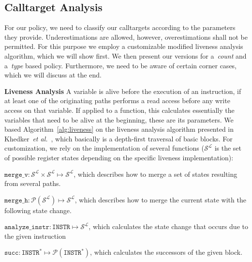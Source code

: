     
\subsection{Calltarget Analysis}
\label{section:calltargetanalysis}
For our policy, we need to classify our calltargets according to the parameters they provide. Underestimations are allowed, however, overestimations shall not be permitted. 
For this purpose we employ a customizable modified liveness analysis algorithm, which we will show first. We then present our versions for a~\emph{count} and a~\emph{type} 
based policy. Furthermore, we need to be aware of certain corner cases, which we will discuss at the end.

\textbf{Liveness Analysis}
A variable is alive before the execution of an instruction, if at least one of the originating paths performs a read access before any write access  on that variable. 
If applied to a function, this calculates essentially the variables that need to be alive at the beginning, these are its parameters.
We based Algorithm~\ref{alg:liveness} on the liveness analysis algorithm presented in Khedker~\textit{et al.}~\cite{khedker2009data}, which basically
is a depth-first traversal of basic blocks. For customization, we rely on the implementation of several functions ($\mathcal{S}^\mathcal{L}$ is the
set of possible register states depending on the specific liveness implementation):

$\texttt{merge\_v} : \mathcal{S}^\mathcal{L} \times \mathcal{S}^\mathcal{L} \mapsto \mathcal{S}^\mathcal{L}$, which describes how to merge a set of states resulting from several paths.

$\texttt{merge\_h} : \mathcal{P}(\mathcal{S}^\mathcal{L}) \mapsto \mathcal{S}^\mathcal{L}$, which describes how to merge the current state with the following state change.

$\texttt{analyze\_instr} : \texttt{INSTR} \mapsto \mathcal{S}^\mathcal{L}$, which calculates the state change that occurs due to the given instruction 

$\texttt{succ} : \texttt{INSTR}^* \mapsto \mathcal{P}(\texttt{INSTR}^*)$, which calculates the successors of the given block.

